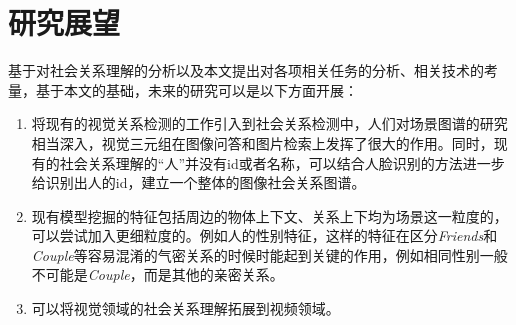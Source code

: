 \section{研究展望}

基于对社会关系理解的分析以及本文提出对各项相关任务的分析、相关技术的考量，基于本文的基础，未来的研究可以是以下方面开展：
\begin{enumerate}
    \item 将现有的视觉关系检测的工作引入到社会关系检测中，人们对场景图谱的研究相当深入，视觉三元组在图像问答和图片检索上发挥了很大的作用。同时，现有的社会关系理解的``人''并没有id或者名称，可以结合人脸识别的方法进一步给识别出人的id，建立一个整体的图像社会关系图谱。
    \item 现有模型挖掘的特征包括周边的物体上下文、关系上下均为场景这一粒度的，可以尝试加入更细粒度的。例如人的性别特征，这样的特征在区分{\it Friends}和{\it Couple}等容易混淆的气密关系的时候时能起到关键的作用，例如相同性别一般不可能是{\it Couple}，而是其他的亲密关系。
    \item 可以将视觉领域的社会关系理解拓展到视频领域。
\end{enumerate}

